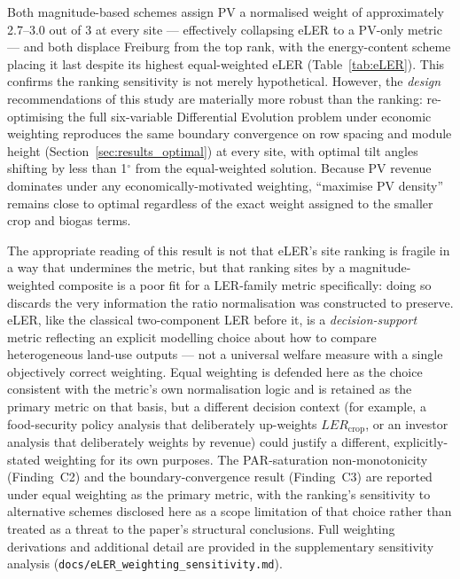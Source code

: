 Both magnitude-based schemes assign PV a normalised weight of
approximately 2.7--3.0 out of 3 at every site --- effectively
collapsing eLER to a PV-only metric --- and both displace Freiburg
from the top rank, with the energy-content scheme placing it last
despite its highest equal-weighted eLER (Table~\ref{tab:eLER}).
This confirms the ranking sensitivity is not merely hypothetical.
However, the \textit{design} recommendations of this study are
materially more robust than the ranking: re-optimising the full
six-variable Differential Evolution problem under economic
weighting reproduces the same boundary convergence on row spacing
and module height (Section~\ref{sec:results_optimal}) at every
site, with optimal tilt angles shifting by less than 1$^{\circ}$
from the equal-weighted solution. Because PV revenue dominates
under any economically-motivated weighting, ``maximise PV density''
remains close to optimal regardless of the exact weight assigned to
the smaller crop and biogas terms.

The appropriate reading of this result is not that eLER's site
ranking is fragile in a way that undermines the metric, but that
ranking sites by a magnitude-weighted composite is a poor fit for a
LER-family metric specifically: doing so discards the very
information the ratio normalisation was constructed to preserve.
eLER, like the classical two-component LER before it, is a
\textit{decision-support} metric reflecting an explicit modelling
choice about how to compare heterogeneous land-use outputs --- not
a universal welfare measure with a single objectively correct weighting.
Equal weighting is defended here as the choice consistent with the
metric's own normalisation logic and is retained as the primary
metric on that basis, but a different decision context (for example,
a food-security policy analysis that deliberately up-weights
$LER_{\text{crop}}$, or an investor analysis that deliberately
weights by revenue) could justify a different, explicitly-stated
weighting for its own purposes. The PAR-saturation non-monotonicity
(Finding~C2) and the boundary-convergence result (Finding~C3) are
reported under equal weighting as the primary metric, with the
ranking's sensitivity to alternative schemes disclosed here as a
scope limitation of that choice rather than treated as a threat to
the paper's structural conclusions. Full weighting derivations and
additional detail are provided in the supplementary sensitivity
analysis (\texttt{docs/eLER\_weighting\_sensitivity.md}).

